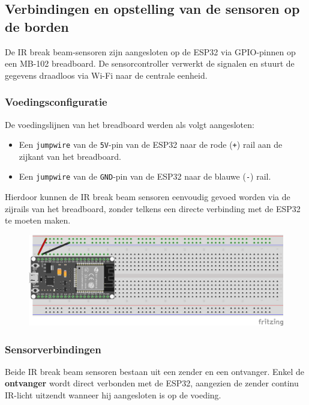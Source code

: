 \subsection{Verbindingen en opstelling van de sensoren op de borden}
De IR break beam-sensoren zijn aangesloten op de ESP32 via GPIO-pinnen op een MB-102 breadboard. De sensorcontroller verwerkt de signalen en stuurt de gegevens draadloos via Wi-Fi naar de centrale eenheid.

\subsubsection{Voedingsconfiguratie}
De voedingslijnen van het breadboard werden als volgt aangesloten:
\begin{itemize}
    \item Een \texttt{jumpwire} van de \texttt{5V}-pin van de ESP32 naar de rode (\texttt{+}) rail aan de zijkant van het breadboard.
    \item Een \texttt{jumpwire} van de \texttt{GND}-pin van de ESP32 naar de blauwe (\texttt{-}) rail.
\end{itemize}

Hierdoor kunnen de IR break beam sensoren eenvoudig gevoed worden via de zijrails van het breadboard, zonder telkens een directe verbinding met de ESP32 te moeten maken.

\begin{figure}[htbp]
    \centering
    \includegraphics[width=\textwidth]{img/bp/wachtruimtes/technische_uitwerking/voeding_configuratie.png}
    \label{fig:voedingconfiguratie}
\end{figure}

\subsubsection{Sensorverbindingen}
Beide IR break beam sensoren bestaan uit een zender en een ontvanger. Enkel de \textbf{ontvanger} wordt direct verbonden met de ESP32, aangezien de zender continu IR-licht uitzendt wanneer hij aangesloten is op de voeding. \\

